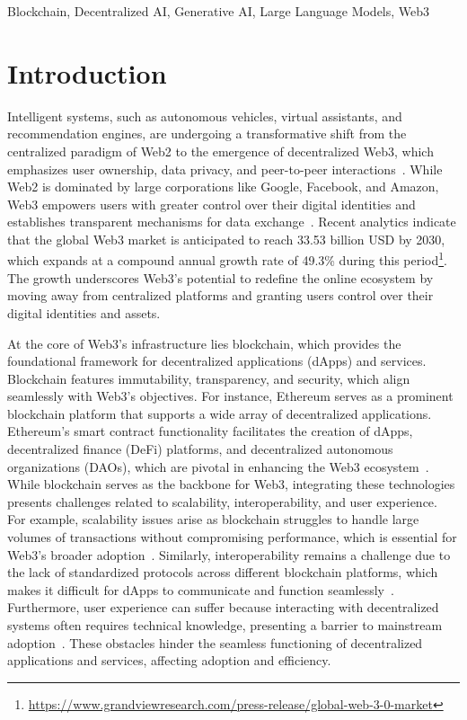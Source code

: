 \documentclass[5p,twocolumn]{elsarticle}
\begin{document}
\begin{frontmatter}
\begin{keyword}
Blockchain, Decentralized AI, Generative AI, Large Language Models, Web3
\end{keyword}

\end{frontmatter}

\section{Introduction} 
\label{sec:intro}
Intelligent systems, such as autonomous vehicles, virtual assistants, and recommendation engines, are undergoing a transformative shift from the centralized paradigm of Web2 to the emergence of decentralized Web3, which emphasizes user ownership, data privacy, and peer-to-peer interactions~\cite{yu2024toward}. While Web2 is dominated by large corporations like Google, Facebook, and Amazon, Web3 empowers users with greater control over their digital identities and establishes transparent mechanisms for data exchange~\cite{zeydan2025decentralizing}. Recent analytics indicate that the global Web3 market is anticipated to reach 33.53 billion USD by 2030, which expands at a compound annual growth rate of 49.3\% during this period\footnote{\url{https://www.grandviewresearch.com/press-release/global-web-3-0-market}}. The growth underscores Web3's potential to redefine the online ecosystem by moving away from centralized platforms and granting users control over their digital identities and assets. 

At the core of Web3's infrastructure lies blockchain, which provides the foundational framework for decentralized applications (dApps) and services. Blockchain features immutability, transparency, and security, which align seamlessly with Web3's objectives. For instance, Ethereum serves as a prominent blockchain platform that supports a wide array of decentralized applications. Ethereum's smart contract functionality facilitates the creation of dApps, decentralized finance (DeFi) platforms, and decentralized autonomous organizations (DAOs), which are pivotal in enhancing the Web3 ecosystem~\cite{hassan2025enabling}. While blockchain serves as the backbone for Web3, integrating these technologies presents challenges related to scalability, interoperability, and user experience. For example, scalability issues arise as blockchain struggles to handle large volumes of transactions without compromising performance, which is essential for Web3's broader adoption~\cite{thong2025know}. Similarly, interoperability remains a challenge due to the lack of standardized protocols across different blockchain platforms, which makes it difficult for dApps to communicate and function seamlessly~\cite{far2024third}. Furthermore, user experience can suffer because interacting with decentralized systems often requires technical knowledge, presenting a barrier to mainstream adoption~\cite{wan2024web3}. These obstacles hinder the seamless functioning of decentralized applications and services, affecting adoption and efficiency.
\end{document}
